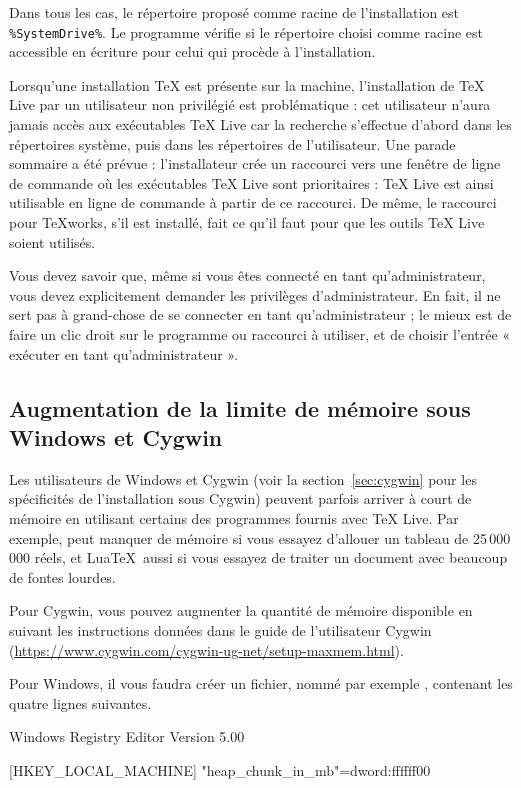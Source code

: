 \documentclass[german, english, french, 12pt]{article}
\renewcommand{\TL}{\TeX{} Live\xspace}%
\begin{document}
Dans tous les cas, le répertoire proposé comme racine de l'installation est
\verb|%SystemDrive%|. %
Le programme  vérifie si le répertoire choisi comme racine est
accessible en écriture pour celui qui procède à l'installation.

Lorsqu'une installation \TeX{} est présente sur la machine, l'installation de
\TL{} par un utilisateur non privilégié est problématique : cet utilisateur
n'aura jamais accès aux exécutables \TL{} car la recherche s'effectue d'abord
dans les répertoires système, puis dans les répertoires de l'utilisateur.  Une
parade sommaire a été prévue : l'installateur crée un raccourci vers une fenêtre
de ligne de commande où les exécutables \TL sont prioritaires : \TL{} est ainsi
utilisable en ligne de commande à partir de ce raccourci. De même, le raccourci
pour \TeX{}works, s'il est installé, fait ce qu'il faut pour que les outils \TL
soient utilisés.

Vous devez savoir que, même si vous êtes connecté en tant qu'administrateur,
vous devez explicitement demander les privilèges d'administrateur.  En fait, il
ne sert pas à grand-chose de se connecter en tant qu'administrateur ; le mieux
est de faire un clic droit sur le programme ou raccourci à utiliser, et de
choisir l'entrée « exécuter en tant qu'administrateur ».


\subsection{Augmentation de la limite de mémoire sous Windows et Cygwin}
\label{sec:cygwin-maxmem}

Les utilisateurs de Windows et Cygwin (voir la section~\ref{sec:cygwin} pour les
spécificités de l'installation sous Cygwin) peuvent parfois arriver à court de
mémoire en utilisant certains des programmes fournis avec \TL. Par exemple,
 peut manquer de mémoire si vous essayez d'allouer un tableau de
25\,000\,000 réels, et Lua\TeX\ aussi si vous essayez de traiter un document
avec beaucoup de fontes lourdes.

Pour Cygwin, vous pouvez augmenter la quantité de mémoire disponible en suivant
les instructions données dans le guide de l'utilisateur Cygwin
(\url{https://www.cygwin.com/cygwin-ug-net/setup-maxmem.html}).

Pour Windows, il vous faudra créer un fichier, nommé par exemple
, contenant les quatre lignes suivantes.

\begin{sverbatim}
Windows Registry Editor Version 5.00

[HKEY_LOCAL_MACHINE\Software\Cygwin]
"heap_chunk_in_mb"=dword:ffffff00
\end{sverbatim}
\end{document}
